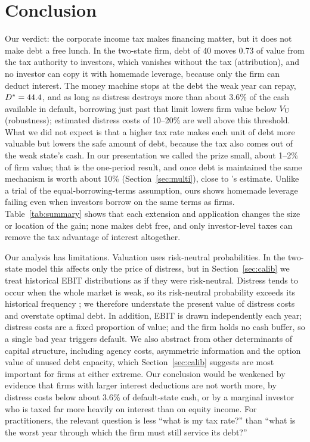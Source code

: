 \section{Conclusion}\label{sec:concl}

Our verdict: the corporate income tax makes financing matter, but it does not make debt a free lunch. In the two-state firm, debt of 40 moves 0.73 of value from the tax authority to investors, which vanishes without the tax (attribution), and no investor can copy it with homemade leverage, because only the firm can deduct interest. The money machine stops at the debt the weak year can repay, $D^{*} = 44.4$, and as long as distress destroys more than about 3.6\% of the cash available in default, borrowing just past that limit lowers firm value below $V_{\mathrm{U}}$ (robustness); estimated distress costs of 10--20\% \citep{andrade1998} are well above this threshold. What we did not expect is that a higher tax rate makes each unit of debt more valuable but lowers the safe amount of debt, because the tax also comes out of the weak state's cash. In our presentation we called the prize small, about 1--2\% of firm value; that is the one-period result, and once debt is maintained the same mechanism is worth about 10\% (Section~\ref{sec:multi}), close to \citeauthor{graham2000}'s \citeyearpar{graham2000} estimate. Unlike a trial of the equal-borrowing-terms assumption, ours shows homemade leverage failing even when investors borrow on the same terms as firms. Table~\ref{tab:summary} shows that each extension and application changes the size or location of the gain; none makes debt free, and only investor-level taxes can remove the tax advantage of interest altogether.

Our analysis has limitations. Valuation uses risk-neutral probabilities. In the two-state model this affects only the price of distress, but in Section~\ref{sec:calib} we treat historical EBIT distributions as if they were risk-neutral. Distress tends to occur when the whole market is weak, so its risk-neutral probability exceeds its historical frequency \citep{almeida2007}; we therefore understate the present value of distress costs and overstate optimal debt. In addition, EBIT is drawn independently each year; distress costs are a fixed proportion of value; and the firm holds no cash buffer, so a single bad year triggers default. We also abstract from other determinants of capital structure, including agency costs, asymmetric information and the option value of unused debt capacity, which Section~\ref{sec:calib} suggests are most important for firms at either extreme. Our conclusion would be weakened by evidence that firms with larger interest deductions are not worth more, by distress costs below about 3.6\% of default-state cash, or by a marginal investor who is taxed far more heavily on interest than on equity income. For practitioners, the relevant question is less ``what is my tax rate?'' than ``what is the worst year through which the firm must still service its debt?''

